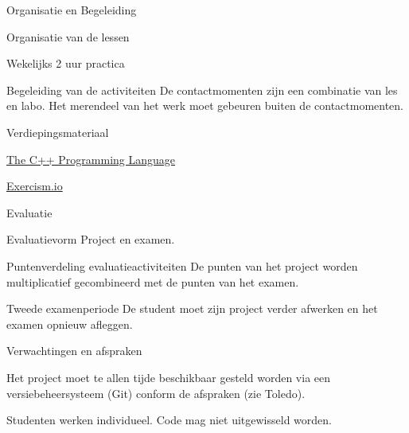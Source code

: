 \documentclass{studiewijzer}
\begin{document}
\showheader

\begin{categorybox}{Organisatie en Begeleiding}
    \begin{category}{Organisatie van de lessen}
        \begin{items}
            \item Wekelijks 2 uur practica
        \end{items}
    \end{category}
    \begin{category}{Begeleiding van de activiteiten}
        De contactmomenten zijn een combinatie van les en labo.
        Het merendeel van het werk moet gebeuren buiten de contactmomenten.
    \end{category}
    \begin{category}{Verdiepingsmateriaal}
        \begin{items}
            \item \href{https://www.stroustrup.com/4th.html}{The C++ Programming Language}
            \item \href{https://exercism.io/}{Exercism.io}
        \end{items}
    \end{category}
\end{categorybox}

\begin{categorybox}{Evaluatie}
    \begin{category}{Evaluatievorm}
        Project en examen.
    \end{category}

    \begin{category}{Puntenverdeling evaluatieactiviteiten}
        De punten van het project worden multiplicatief gecombineerd
        met de punten van het examen.
    \end{category}

    \begin{category}{Tweede examenperiode}
        De student moet zijn project verder afwerken en het examen opnieuw afleggen.
    \end{category}

    \begin{category}{Verwachtingen en afspraken}
        \begin{items}
            \item Het project moet te allen tijde beschikbaar gesteld worden via een versiebeheersysteem (Git) conform de afspraken (zie Toledo).
            \item Studenten werken individueel. Code mag niet uitgewisseld worden.
        \end{items}
    \end{category}
\end{categorybox}
\end{document}
